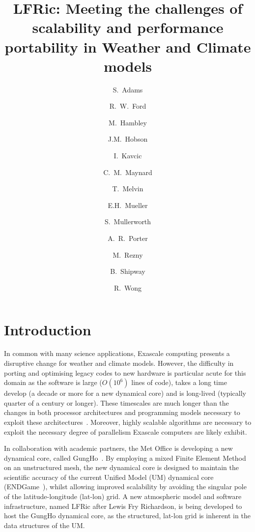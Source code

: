 \documentclass[review,times]{elsarticle}
\begin{document}
\begin{frontmatter}

\title{LFRic: Meeting the challenges of scalability and performance portability in Weather and Climate models}

\author[met]{S.~Adams}
\author[hartree]{R.~W.~Ford}
\author[met]{M.~Hambley}
\author[met]{J.M.~Hobson}
\author[met]{I.~Kavcic}
\author[met,read]{C.~M.~Maynard}
\author[met]{T.~Melvin}
\author[bath]{E.H.~Mueller}
\author[met]{S.~Mullerworth}
\author[hartree]{A.~R.~Porter}
\author[downunder]{M.~Rezny}
\author[met]{B.~Shipway}
\author[met]{R.~Wong}


\address[met]{Met Office, FitzRoy Road, Exeter, EX1 3PB}
\address[hartree]{Hartree Centre, STFC Daresbury, Grim up North}
\address[read]{Department of Computer Science, Polly Vacher Building,
  University of Reading, Reading, UK, RG6 6AY}
\address[bath]{Department of Mathematics, University of Bath, Bath}
\address[downunder]{Monash University, Melbourne, Australia}

\begin{abstract}
\end{abstract}

\begin{keyword}

\end{keyword}

\end{frontmatter}

\newpage
\section{Introduction}
In common with many science applications, Exascale computing presents
a disruptive change for weather and climate models. However, the
difficulty in porting and optimising legacy codes to new hardware is
particular acute for this domain as the software is large ($O(10^6)$
lines of code), takes a long time develop (a decade or more for a new
dynamical core) and is long-lived (typically quarter of a century or longer). These
timescales are much longer than the changes in both processor
architectures and programming models necessary to exploit these
architectures~\cite{gmd-2017-186}. Moreover, highly scalable
algorithms are necessary to exploit the necessary degree of
parallelism Exascale computers are likely exhibit.

In collaboration with academic partners, the Met Office is developing
a new dynamical core, called GungHo~\cite{melvin2018}. By employing a
mixed Finite Element Method on an unstructured mesh, the new dynamical
core is designed to maintain the scientific accuracy of the current
Unified Model (UM) dynamical core (ENDGame~\cite{QJ:QJ2235}), whilst
allowing improved scalability by avoiding the singular pole of the
latitude-longitude (lat-lon) grid. A new atmospheric model and software infrastructure,
named LFRic after Lewis Fry Richardson, is being developed to host the
GungHo dynamical core, as the structured,  lat-lon
grid is inherent in the data structures of the UM.
\end{document}
